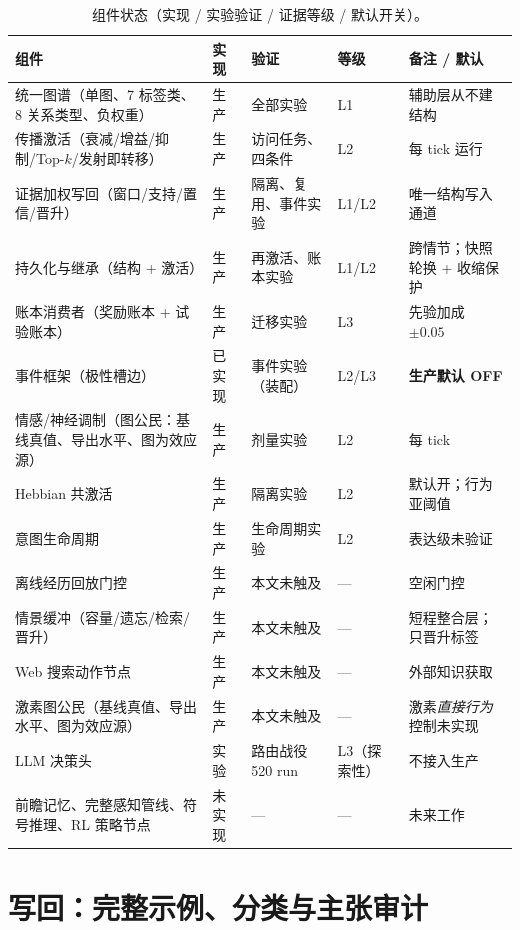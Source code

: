 \documentclass[10pt,a4paper]{ctexart}
\begin{document}
\begin{table}[h]
\centering\small
\caption{组件状态（实现 / 实验验证 / 证据等级 / 默认开关）。}
\label{tab:s-components}
\begin{tabular}{L{3.6cm}L{1.9cm}L{2.6cm}L{1.2cm}L{4.6cm}}
\toprule
\textbf{组件} & \textbf{实现} & \textbf{验证} & \textbf{等级} & \textbf{备注 / 默认} \\
\midrule
统一图谱（单图、7 标签类、8 关系类型、负权重） & 生产 & 全部实验 & L1 & 辅助层从不建结构 \\
传播激活（衰减/增益/抑制/Top-$k$/发射即转移） & 生产 & 访问任务、四条件 & L2 & 每 tick 运行 \\
证据加权写回（窗口/支持/置信/晋升） & 生产 & 隔离、复用、事件实验 & L1/L2 & 唯一结构写入通道 \\
持久化与继承（结构 + 激活） & 生产 & 再激活、账本实验 & L1/L2 & 跨情节；快照轮换 + 收缩保护 \\
账本消费者（奖励账本 + 试验账本） & 生产 & 迁移实验 & L3 & 先验加成 $\pm0.05$ \\
事件框架（极性槽边） & 已实现 & 事件实验（装配） & L2/L3 & \textbf{生产默认 OFF} \\
情感/神经调制（图公民：基线真值、导出水平、图为效应源） & 生产 & 剂量实验 & L2 & 每 tick \\
Hebbian 共激活 & 生产 & 隔离实验 & L2 & 默认开；行为亚阈值 \\
意图生命周期 & 生产 & 生命周期实验 & L2 & 表达级未验证 \\
离线经历回放门控 & 生产 & 本文未触及 & --- & 空闲门控 \\
情景缓冲（容量/遗忘/检索/晋升） & 生产 & 本文未触及 & --- & 短程整合层；只晋升标签 \\
Web 搜索动作节点 & 生产 & 本文未触及 & --- & 外部知识获取 \\
激素图公民（基线真值、导出水平、图为效应源） & 生产 & 本文未触及 & --- & 激素\emph{直接行为}控制未实现 \\
LLM 决策头 & 实验 & 路由战役 520 run & L3（探索性） & 不接入生产 \\
前瞻记忆、完整感知管线、符号推理、RL 策略节点 & 未实现 & --- & --- & 未来工作 \\
\bottomrule
\end{tabular}
\end{table}

\section{写回：完整示例、分类与主张审计}
\label{s5:wb}
\end{document}
